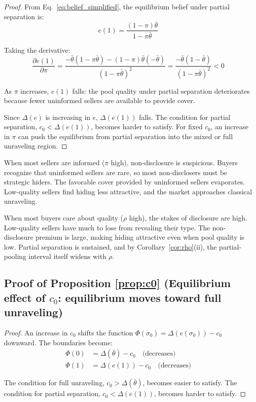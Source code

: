 \documentclass[10pt,letterpaper]{bp-template-concise}
\begin{document}
\begin{proof}
From Eq.~\eqref{eq:belief_simplified}, the equilibrium belief under partial separation is:
\begin{equation}
    e(1) = \frac{(1-\pi)\bar{\theta}}{1 - \pi\bar{\theta}}
\end{equation}

Taking the derivative:
\begin{equation}
    \frac{\partial e(1)}{\partial \pi} = \frac{-\bar{\theta}(1-\pi\bar{\theta}) - (1-\pi)\bar{\theta}(-\bar{\theta})}{(1-\pi\bar{\theta})^2} = \frac{-\bar{\theta}(1-\bar{\theta})}{(1-\pi\bar{\theta})^2} < 0
\end{equation}

As $\pi$ increases, $e(1)$ falls: the pool quality under partial separation deteriorates because fewer uninformed sellers are available to provide cover.

Since $\Delta(e)$ is increasing in $e$, $\Delta(e(1))$ falls. The condition for partial separation, $c_0 < \Delta(e(1))$, becomes harder to satisfy. For fixed $c_0$, an increase in $\pi$ can push the equilibrium from partial separation into the mixed or full unraveling region.
\end{proof}

When most sellers are informed ($\pi$ high), non-disclosure is suspicious. Buyers recognize that uninformed sellers are rare, so most non-disclosers must be strategic hiders. The favorable cover provided by uninformed sellers evaporates. Low-quality sellers find hiding less attractive, and the market approaches classical unraveling.

When most buyers care about quality ($\rho$ high), the stakes of disclosure are high. Low-quality sellers have much to lose from revealing their type. The non-disclosure premium is large, making hiding attractive even when pool quality is low. Partial separation is sustained, and by Corollary~\ref{cor:rho}(ii), the partial-pooling interval itself widens with $\rho$.

\subsection*{Proof of Proposition \ref{prop:c0} (Equilibrium effect of $c_0$: equilibrium moves toward full unraveling)}

\begin{proof}
An increase in $c_0$ shifts the function $\Phi(\sigma_0) = \Delta(e(\sigma_0)) - c_0$ downward. The boundaries become:
\begin{equation}
    \begin{split}
        \Phi(0) &= \Delta(\bar{\theta}) - c_0 \quad \text{(decreases)} \\
        \Phi(1) &= \Delta(e(1)) - c_0 \quad \text{(decreases)}
    \end{split}
\end{equation}

The condition for full unraveling, $c_0 > \Delta(\bar{\theta})$, becomes easier to satisfy. The condition for partial separation, $c_0 < \Delta(e(1))$, becomes harder to satisfy.
\end{proof}
\end{document}
